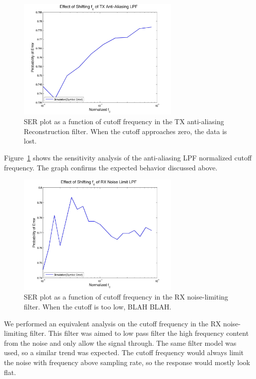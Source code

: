 \documentclass[]{article}
\begin{document}
\begin{figure}[H]
\centering
\hspace*{-2cm}\includegraphics[width=0.7\textwidth]{freqTX.jpg}
\caption{SER plot as a function of cutoff frequency in the TX anti-aliasing Reconstruction filter.  When the cutoff approaches zero, the data is lost. \label{fig:freqTX}}
\end{figure}

Figure~\ref{fig:freqTX} shows the sensitivity analysis of the anti-aliasing LPF normalized cutoff frequency.  The graph confirms the expected behavior discussed above.

\begin{figure}[H]
\centering
\hspace*{-2cm}\includegraphics[width=0.7\textwidth]{freqRX.jpg}
\caption{SER plot as a function of cutoff frequency in the RX noise-limiting filter.  When the cutoff is too low, BLAH BLAH. \label{fig:freqRX}}
\end{figure}

We performed an equivalent analysis on the cutoff frequency in the RX noise-limiting filter.  This filter was aimed to low pass filter the high frequency content from the noise and only allow the signal through.  The same filter model was used, so a similar trend was expected.  The cutoff frequency would always limit the noise with frequency above sampling rate, so the response would mostly look flat.  
\end{document}
